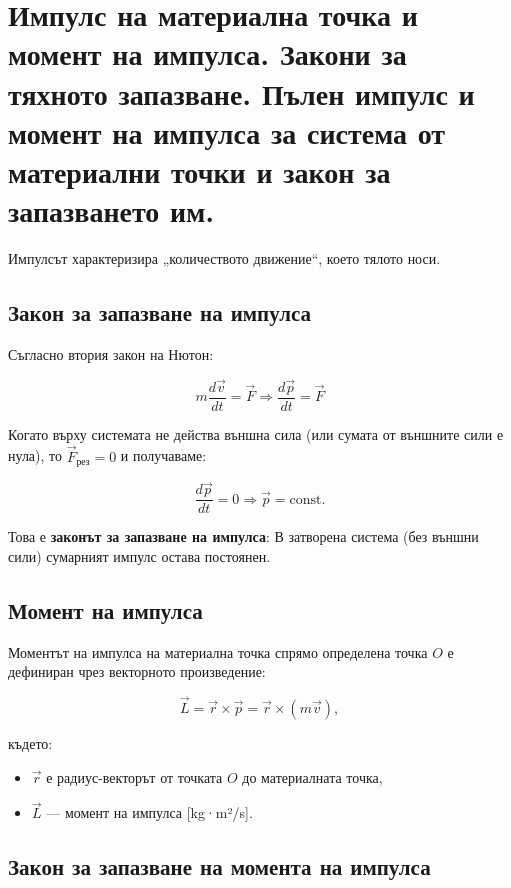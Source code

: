 \documentclass{report}
\begin{document}
\section{Импулс на материална точка и момент на импулса. Закони за тяхното запазване.
Пълен импулс и момент на импулса за система от материални точки и закон за
запазването им.}






Импулсът характеризира „количеството движение“, което тялото носи.

\subsection{Закон за запазване на импулса}

Съгласно втория закон на Нютон:


$$m\frac{d\vec{v}}{dt} = \vec{F}\Rightarrow \frac{d\vec{p}}{dt} = \vec{F}$$

Когато върху системата не действа външна сила (или сумата от външните сили е нула), то \(\vec{F}_{\text{рез}} = 0\) и получаваме:

\[
\frac{d\vec{p}}{dt} = 0 \Rightarrow \vec{p} = \text{const}.
\]

Това е \textbf{законът за запазване на импулса}: В затворена система (без външни сили) сумарният импулс остава постоянен.

\subsection{Момент на импулса}

Моментът на импулса на материална точка спрямо определена точка \( O \) е дефиниран чрез векторното произведение:

\[
\vec{L} = \vec{r} \times \vec{p} = \vec{r} \times (m\vec{v}),
\]

където:
\begin{itemize}
    \item \( \vec{r} \) е радиус-векторът от точката \( O \) до материалната точка,
    \item \( \vec{L} \) — момент на импулса [kg·m²/s].
\end{itemize}
\newpage
\subsection{Закон за запазване на момента на импулса}
\end{document}

